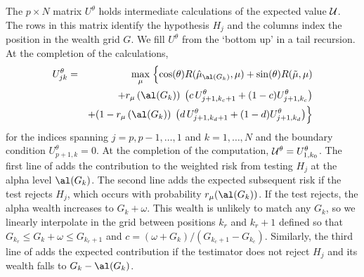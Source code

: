 \documentclass[12pt]{article}
\begin{document}
 The $p \times N$ matrix $U^{\theta}$ holds intermediate calculations of the
 expected value $\cal U$.  The rows in this matrix identify the hypothesis $H_j$
 and the columns index the position in the wealth grid $G$.  We fill $U^\theta$
 from the `bottom up' in a tail recursion.  At the completion of the
 calculations,
 \begin{eqnarray}
   U^\theta_{jk} &=&  \max_\mu \;\Bigl\{
     \cos(\theta) R(\hat\mu_{\al(G_k)}, \mu) + \sin(\theta) R(\tilde{\mu},\mu) \cr
     & &+ r_\mu\left(\al(G_k)\right) \;
          \left(c \,U^{\theta}_{j+1,k_c+1} + (1-c) U^{\theta}_{j+1,k_c}\right) \cr
     & & + (1- r_\mu\left(\al(G_k)\right) \; 
          \left(d \,U^{\theta}_{j+1,k_d+1} + (1-d) U^{\theta}_{j+1,k_d}\right)   
     \Bigr\}
 \label{eq:Ujk}
 \end{eqnarray}
 for the indices spanning $j=p, p-1,\ldots,1$ and $k = 1,\ldots,N$ and the
 boundary condition $U^\theta_{p+1,k} = 0$.  At the completion of the
 computation, ${\cal U}^\theta = U^{\theta}_{1,k_0}$.  The first line of
  adds the contribution to the weighted risk from testing $H_j$ at
 the alpha level $\al(G_k)$.  The second line adds the expected subsequent risk
 if the test rejects $H_j$, which occurs with probability $r_\mu(\al(G_k))$.  If
 the test rejects, the alpha wealth increases to $G_k + \omega$.  This wealth is
 unlikely to match any $G_k$, so we linearly interpolate in the grid between
 positions $k_r$ and $k_r+1$ defined so that $G_{k_r} \le G_k + \omega \le
 G_{k_r+1}$ and $c = (\omega+G_k)/(G_{k_c+1}-G_{k_c})$.  Similarly, the third
 line of  adds the expected contribution if the testimator does not
 reject $H_j$ and its wealth falls to $G_k - \al(G_k)$.  

\end{document}
